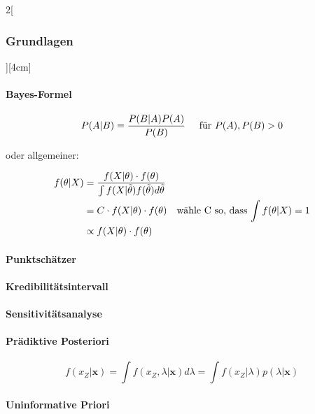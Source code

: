 \documentclass[8pt]{extarticle}
\begin{document}
\begin{multicols}{2}[\subsubsection{Grundlagen}][4cm] 

\paragraph{Bayes-Formel}
$$P(A|B)=\frac{P(B|A)P(A)}{P(B)} \hspace{0.5cm} \text{für } P(A), P(B) > 0$$

\begin{center}oder allgemeiner:\end{center}

\vspace{-1 em}

\begin{align*}
  f(\theta | X) &= \frac{f(X | \theta ) \cdot f(\theta)}{\int f(X|\tilde{\theta}) f(\tilde{\theta})  d \tilde{\theta}}\\
  &= C \cdot f(X | \theta ) \cdot f(\theta) \hspace{1 em} \text{wähle C so, dass $\int f(\theta | X)=1$} \\
  &\propto f(X | \theta ) \cdot f(\theta)
\end{align*}

\paragraph{Punktschätzer}

\paragraph{Kredibilitätsintervall}

\paragraph{Sensitivitätsanalyse}

\paragraph{Prädiktive Posteriori}

$$f(x_Z|\mathbf{x}) =\int f(x_Z, \lambda|\mathbf{x})d\lambda = \int f(x_Z|\lambda)p(\lambda|\mathbf{x})$$

\paragraph{Uninformative Priori} ~\\


\end{multicols}
\end{document}
